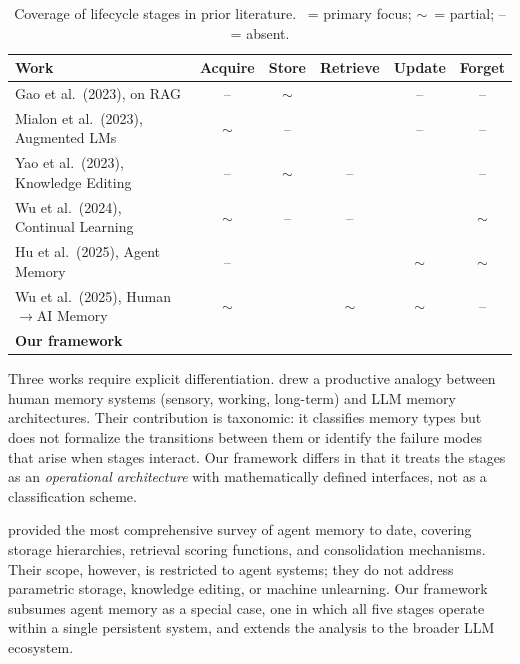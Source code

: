 \documentclass{article}
\newcommand{\fullmark}{\checkmark}
\newcommand{\halfmark}{$\sim$}
\begin{document}
\begin{table}[t]
\centering
\caption{Coverage of lifecycle stages in prior literature. \fullmark\ = primary focus; \halfmark\ = partial; -- = absent.}
\label{tab:survey_comparison}
\small
\begin{tabular}{@{}lccccc@{}}
\toprule
\textbf{Work} & \textbf{Acquire} & \textbf{Store} & \textbf{Retrieve} & \textbf{Update} & \textbf{Forget} \\
\midrule
Gao et al.\ (2023), on RAG & -- & \halfmark & \fullmark & -- & -- \\
Mialon et al.\ (2023), Augmented LMs & \halfmark & -- & \fullmark & -- & -- \\
Yao et al.\ (2023), Knowledge Editing & -- & \halfmark & -- & \fullmark & -- \\
Wu et al.\ (2024), Continual Learning & \halfmark & -- & -- & \fullmark & \halfmark \\
Hu et al.\ (2025), Agent Memory & -- & \fullmark & \fullmark & \halfmark & \halfmark \\
Wu et al.\ (2025), Human$\to$AI Memory & \halfmark & \fullmark & \halfmark & \halfmark & -- \\
\midrule
\textbf{Our framework} & \fullmark & \fullmark & \fullmark & \fullmark & \fullmark \\
\bottomrule
\end{tabular}
\vspace{-1em}
\end{table}

Three works require explicit differentiation. \citet{wu2025humanmemory} drew a productive analogy between human memory systems (sensory, working, long-term) and LLM memory architectures. Their contribution is taxonomic: it classifies memory types but does not formalize the transitions between them or identify the failure modes that arise when stages interact. Our framework differs in that it treats the stages as an \textit{operational architecture} with mathematically defined interfaces, not as a classification scheme.

\citet{hu2025agentmemory} provided the most comprehensive survey of agent memory to date, covering storage hierarchies, retrieval scoring functions, and consolidation mechanisms. Their scope, however, is restricted to agent systems; they do not address parametric storage, knowledge editing, or machine unlearning. Our framework subsumes agent memory as a special case, one in which all five stages operate within a single persistent system, and extends the analysis to the broader LLM ecosystem.
\end{document}
